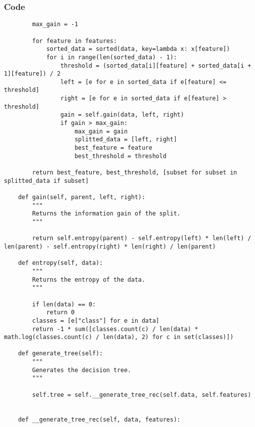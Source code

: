 \documentclass{beamer}
\begin{document}
\begin{frame}[fragile]
    \frametitle{Code}
    \fontsize{3pt}{5pt}\selectfont
    \begin{verbatim}
        max_gain = -1
        
        for feature in features:
            sorted_data = sorted(data, key=lambda x: x[feature])
            for i in range(len(sorted_data) - 1):
                threshold = (sorted_data[i][feature] + sorted_data[i + 1][feature]) / 2
                left = [e for e in sorted_data if e[feature] <= threshold]
                right = [e for e in sorted_data if e[feature] > threshold]
                gain = self.gain(data, left, right)
                if gain > max_gain:
                    max_gain = gain
                    splitted_data = [left, right]
                    best_feature = feature
                    best_threshold = threshold
                    
        return best_feature, best_threshold, [subset for subset in splitted_data if subset]
    
    def gain(self, parent, left, right):
        """
        Returns the information gain of the split.
        """

        return self.entropy(parent) - self.entropy(left) * len(left) / len(parent) - self.entropy(right) * len(right) / len(parent)
    
    def entropy(self, data):
        """
        Returns the entropy of the data.
        """

        if len(data) == 0:
            return 0
        classes = [e["class"] for e in data]
        return -1 * sum([classes.count(c) / len(data) * math.log(classes.count(c) / len(data), 2) for c in set(classes)])

    def generate_tree(self):
        """
        Generates the decision tree.
        """

        self.tree = self.__generate_tree_rec(self.data, self.features)

        
    def __generate_tree_rec(self, data, features):
    \end{verbatim}
\end{frame}
\end{document}
